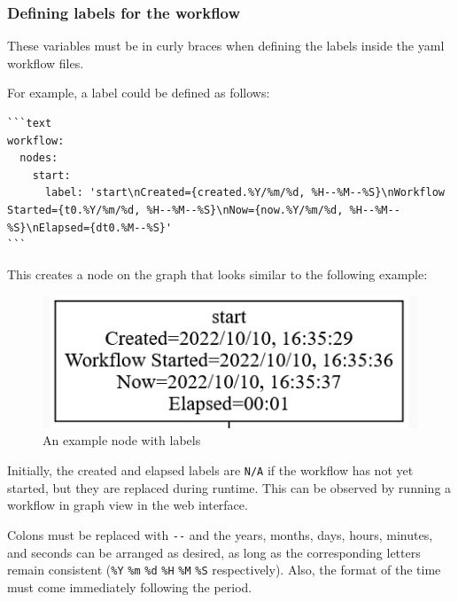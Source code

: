 \subsubsection{Defining labels for the
workflow}\label{defining-labels-for-the-workflow}

These variables must be in curly braces when defining the labels inside
the yaml workflow files.

For example, a label could be defined as follows:

\begin{verbatim}
```text
workflow:
  nodes:
    start:
      label: 'start\nCreated={created.%Y/%m/%d, %H--%M--%S}\nWorkflow Started={t0.%Y/%m/%d, %H--%M--%S}\nNow={now.%Y/%m/%d, %H--%M--%S}\nElapsed={dt0.%M--%S}'
```
\end{verbatim}

This creates a node on the graph that looks similar to the following
example:

\begin{figure}
\centering
\includegraphics{images/labelmaker-example.png}
\caption{An example node with labels}
\end{figure}

Initially, the created and elapsed labels are \texttt{N/A} if the
workflow has not yet started, but they are replaced during runtime. This
can be observed by running a workflow in graph view in the web
interface.

Colons must be replaced with \texttt{-\/-} and the years, months, days,
hours, minutes, and seconds can be arranged as desired, as long as the
corresponding letters remain consistent (\texttt{\%Y} \texttt{\%m}
\texttt{\%d} \texttt{\%H} \texttt{\%M} \texttt{\%S} respectively). Also,
the format of the time must come immediately following the period.

